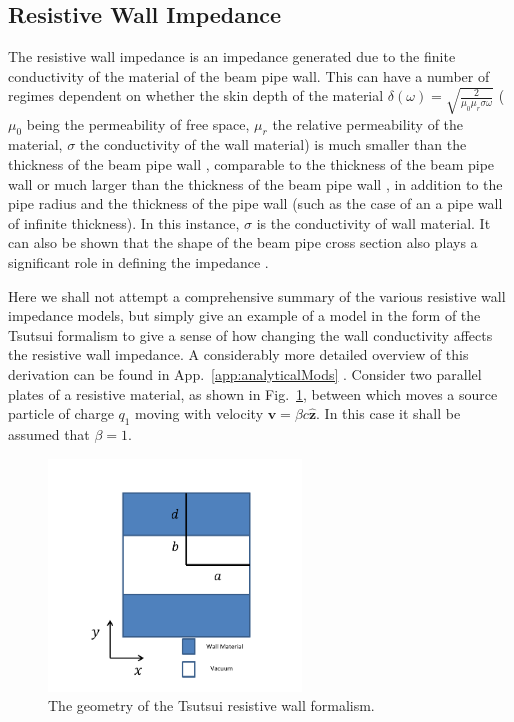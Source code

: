 \subsection{Resistive Wall Impedance}
\label{sec:res_wall_imp}

The resistive wall impedance is an impedance generated due to the finite conductivity of the material of the beam pipe wall. This can have a number of regimes dependent on whether the skin depth of the material $\delta \left( \omega \right) = \sqrt{\frac{2}{\mu_{0} \mu_{r} \sigma \omega}}$ ($\mu_{0}$ being the permeability of free space, $\mu_{r}$ the relative permeability of the material, $\sigma$ the conductivity of the wall material) is much smaller than the thickness of the beam pipe wall \cite{Chao:PhysColEff}, comparable to the thickness of the beam pipe wall \cite{Roncarolo:ColImpMeas, Metral:ResWallWideFreq} or much larger than the thickness of the beam pipe wall \cite{Tsutsui:ferrKickLong, Biancacci:MMFiniteInsert}, in addition to the pipe radius and the thickness of the pipe wall (such as the case of an a pipe wall of infinite thickness). In this instance, $\sigma$ is the conductivity of wall material. It can also be shown that the shape of the beam pipe cross section also plays a significant role in defining the impedance \cite{Mounet:Axisymmetric, Mounet:Flat}.

Here we shall not attempt a comprehensive summary of the various resistive wall impedance models, but simply give an example of a model in the form of the Tsutsui formalism to give a sense of how changing the wall conductivity affects the resistive wall impedance. A considerably more detailed overview of this derivation can be found in App.~\ref{app:analyticalMods} \cite{Tsutsui:ferrKickLong, Tsutsui:DipoleKicker}. Consider two parallel plates of a resistive material, as shown in Fig.~\ref{fig:res_wall_diagram}, between which moves a source particle of charge $q_{1}$ moving with velocity $\mathbf{v} = \beta c \mathbf{\hat{z}}$. In this case it shall be assumed that $\beta = 1$.

\begin{figure}
\begin{center}
\includegraphics[width=0.6\textwidth]{Wakefields_and_Impedances/figures/reWallGeo.pdf}
\end{center}
\caption{The geometry of the Tsutsui resistive wall formalism.}
\label{fig:res_wall_diagram}
\end{figure}

